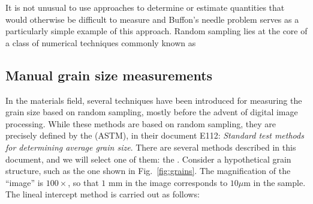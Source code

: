 It is not unusual to use  approaches to determine or estimate quantities that would otherwise be difficult to measure and Buffon's needle problem serves as a particularly simple example of this approach. Random sampling lies at the core of a class of numerical techniques commonly known as 


\subsection{Manual grain size measurements}
In the materials field, several techniques have been introduced for measuring the grain size based on random sampling, mostly before the advent of digital image processing.  While these methods are based on random sampling, they are precisely defined by the  (ASTM), in their document E112: \textit{Standard test methods for determining average grain size}. There are several methods described in this document, and we will select one of them: the . Consider a hypothetical grain structure, such as the one shown in Fig.~\ref{fig:grains}.  The magnification of the ``image''  is $100\times$, so that $1$ mm in the image corresponds to $10 \mu$m in the sample.  The lineal intercept method is carried out as follows:
























